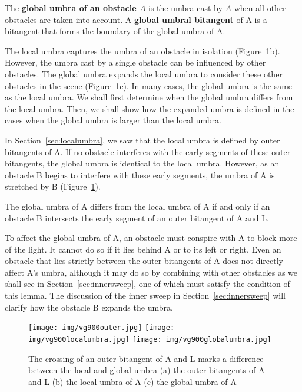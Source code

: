 \documentclass[9pt]{article}
\begin{document}
\begin{defn2}
\label{defn:global}
The {\bf global umbra of an obstacle $A$} is the umbra cast by $A$
when all other obstacles are taken into account.
A {\bf global umbral bitangent} of A is a bitangent 
that forms the boundary of the global umbra of A.
\end{defn2}

The local umbra captures the umbra of an obstacle in isolation (Figure~\ref{fig:vg900}b).
However, the umbra cast by a single obstacle can be influenced by other obstacles.
The global umbra expands the local umbra to consider these other obstacles in the scene
(Figure~\ref{fig:vg900}c).
In many cases, the global umbra is the same as the local umbra.
We shall first determine when the global umbra differs from the local umbra.
Then, we shall show how the expanded umbra is defined in the cases when
the global umbra is larger than the local umbra.

In Section~\ref{sec:localumbra}, we saw that
the local umbra is defined by outer bitangents of A.
If no obstacle interferes with the early segments of these outer bitangents,
the global umbra is identical to the local umbra.
However, as an obstacle B begins to interfere with these early segments,
the umbra of A is stretched by B (Figure~\ref{fig:vg900}).

\begin{lemma}
\label{lem:differs}
The global umbra of A differs from the local umbra of A
if and only if an obstacle B intersects the early segment
of an outer bitangent of A and L.
\end{lemma}
\prf
To affect the global umbra of A,
an obstacle must conspire with A to block more of the light.
It cannot do so if it lies behind A or to its left or right.
Even an obstacle that lies strictly between the outer bitangents of A
does not directly affect A's umbra, although it may do so by combining
with other obstacles as we shall see in Section~\ref{sec:innersweep}, 
one of which must satisfy the condition of this lemma.
The discussion of the inner sweep in Section~\ref{sec:innersweep}
will clarify how the obstacle B expands the umbra.
\QED

\begin{figure}[h]
\begin{center}
\texttt{[image: img/vg900outer.jpg]}
\texttt{[image: img/vg900localumbra.jpg]}
\texttt{[image: img/vg900globalumbra.jpg]}
\end{center}
\caption{The crossing of an outer bitangent of A and L 
	     marks a difference between the local and global umbra
	 (a) the outer bitangents of A and L
	 (b) the local umbra of A
 	 (c) the global umbra of A
}
\label{fig:vg900}
\end{figure}
\end{document}
